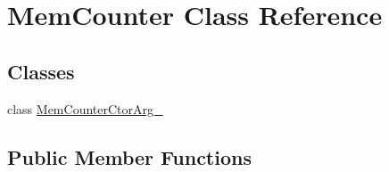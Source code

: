 \hypertarget{class_mem_counter}{}\section{Mem\+Counter Class Reference}
\label{class_mem_counter}
\subsection*{Classes}
\begin{DoxyCompactItemize}
\item 
class \mbox{\hyperlink{class_mem_counter_1_1_mem_counter_ctor_arg__}{Mem\+Counter\+Ctor\+Arg\+\_\+}}
\end{DoxyCompactItemize}
\subsection*{Public Member Functions}
